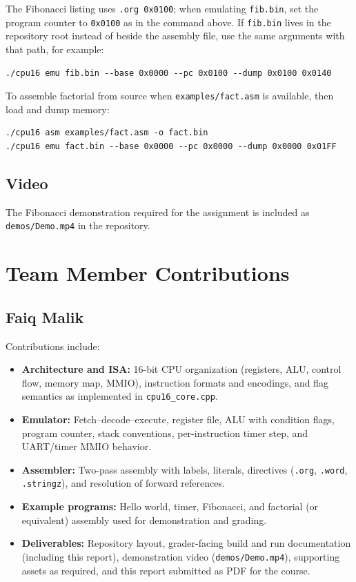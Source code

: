 \documentclass[12pt]{article}
\begin{document}
\noindent
The Fibonacci listing uses \texttt{.org 0x0100}; when emulating \texttt{fib.bin}, set the program counter to \texttt{0x0100} as in the command above. If \texttt{fib.bin} lives in the repository root instead of beside the assembly file, use the same arguments with that path, for example:

\begin{verbatim}
./cpu16 emu fib.bin --base 0x0000 --pc 0x0100 --dump 0x0100 0x0140
\end{verbatim}

\noindent
To assemble factorial from source when \texttt{examples/fact.asm} is available, then load and dump memory:

\begin{verbatim}
./cpu16 asm examples/fact.asm -o fact.bin
./cpu16 emu fact.bin --base 0x0000 --pc 0x0000 --dump 0x0000 0x01FF
\end{verbatim}

\subsection*{Video}

\noindent
The Fibonacci demonstration required for the assignment is included as \texttt{demos/Demo.mp4} in the repository.

\clearpage

\section*{Team Member Contributions}

\subsection*{Faiq Malik}

\noindent
Contributions include:

\begin{itemize}
  \item \textbf{Architecture and ISA:} 16-bit CPU organization (registers, ALU, control flow, memory map, MMIO), instruction formats and encodings, and flag semantics as implemented in \texttt{cpu16\_core.cpp}.
  \item \textbf{Emulator:} Fetch--decode--execute, register file, ALU with condition flags, program counter, stack conventions, per-instruction timer step, and UART/timer MMIO behavior.
  \item \textbf{Assembler:} Two-pass assembly with labels, literals, directives (\texttt{.org}, \texttt{.word}, \texttt{.stringz}), and resolution of forward references.
  \item \textbf{Example programs:} Hello world, timer, Fibonacci, and factorial (or equivalent) assembly used for demonstration and grading.
  \item \textbf{Deliverables:} Repository layout, grader-facing build and run documentation (including this report), demonstration video (\texttt{demos/Demo.mp4}), supporting assets as required, and this report submitted as PDF for the course.
\end{itemize}
\end{document}
